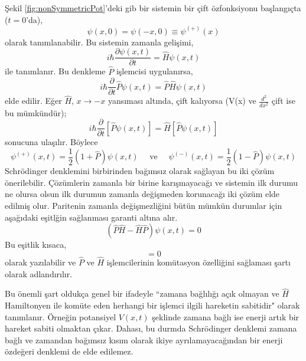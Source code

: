 \documentclass[a4paper,12pt, twoside]{article}
\begin{document}
Şekil \ref{fig:nonSymmetricPot}'deki gib bir sistemin bir çift özfonksiyonu başlangıçta ($t=0$'da),
\begin{equation}
\psi(x, 0)=\psi(-x, 0) \equiv \psi^{(+)}(x)
\end{equation}
olarak tanımlanabilir. Bu sistemin zamanla gelişimi,
\begin{equation}
i \hbar \frac{\partial \psi(x, t)}{\partial t}= \hat H \psi(x, t)
\end{equation}
ile tanımlanır. Bu denkleme $\hat P$ işlemcisi uygulanırsa,
\begin{equation}
i \hbar \frac{\partial}{\partial t} \hat P \psi(x, t)= \hat P  \hat H \psi(x, t)
\end{equation}
elde edilir. Eğer $\hat H$, $x \rightarrow -x$ yansıması altında, çift kalıyorsa (V(x) ve $\frac{d^2}{dx^2}$ çift ise bu mümkündür);
\begin{equation}
i \hbar \frac{\partial}{\partial t}[ \hat P \psi(x, t)]= \hat H[ \hat P \psi(x, t)]
\end{equation}
sonucuna ulaşılır. Böylece
\begin{equation}
\psi^{(+)}(x, t)=\frac{1}{2}(1+ \hat P) \psi(x, t) \quad \text{ ve } \quad \psi^{(-)}(x, t)=\frac{1}{2}(1- \hat P) \psi(x, t) 
\end{equation}
Schrödinger denklemini birbirinden bağımsız olarak sağlayan bu iki çözüm önerilebilir. Çözümlerin zamanla bir birine karışmayacağı ve sistemin ilk durumu ne olursa olsun ilk durumun zamanla değişmeden korunacağı iki çözüm elde edilmiş olur.
Paritenin zamanla değişmezliğini bütün mümkün durumlar için aşağıdaki eşitlğin sağlanması garanti altına alır. 
\begin{equation}
( \hat P  \hat H-  \hat H  \hat P) \psi(x, t)=0
\end{equation}
Bu eşitlik kısaca,
\begin{equation}
[ \hat P,  \hat H]=0
\end{equation}
olarak yazılabilir ve $\hat P$ ve $\hat H$ işlemcilerinin komütasyon özelliğini sağlaması şartı olarak adlandırılır.

Bu önemli şart oldukça genel bir ifadeyle ``zamana bağlılığı açık olmayan ve $\hat H$ Hamiltonyen ile komüte eden herhangi bir işlemci ilgili hareketin sabitidir" olarak tanımlanır. Örneğin potansiyel $V(x,t)$ şeklinde zamana bağlı ise enerji artık bir hareket sabiti olmaktan çıkar. Dahası, bu durmda Schrödinger denklemi zamana bağlı ve zamandan bağımsız kısım olarak ikiye ayrılamayacağından bir enerji özdeğeri denklemi de elde edilemez.
\end{document}
